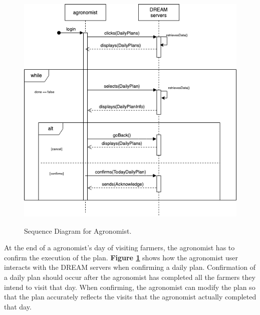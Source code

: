 \begin{figure}[hpt!]
\centering
\includegraphics[scale=0.5]{Files/sequence_disgrams/thePNGs/agronomist_confirmPlan.png}\\
\caption{\label{fig:agrSeqConfirmPlan}Sequence Diagram for Agronomist.}
\end{figure}

\begin{flushleft}
At the end of a agronomist's day of visiting farmers, the agronomist has to confirm the execution of the plan. \textbf{Figure \ref{fig:agrSeqConfirmPlan}} shows how the agronomist user interacts with the DREAM servers when confirming a daily plan. Confirmation of a daily plan should occur after the agronomist has completed all the farmers they intend to visit that day. When confirming, the agronomist can modify the plan so that the plan accurately reflects the visits that the agronomist actually completed that day.
\end{flushleft}


